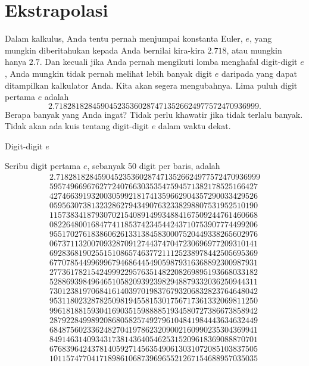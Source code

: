 
\section{\label{sec:Extrapolation}Ekstrapolasi}

Dalam kalkulus, Anda tentu pernah menjumpai konstanta Euler, $e$,
yang mungkin diberitahukan kepada Anda bernilai kira-kira $2.718$,
atau mungkin hanya $2.7$. Dan kecuali jika Anda pernah mengikuti
lomba menghafal digit-digit $e$, Anda mungkin tidak pernah melihat
lebih banyak digit $e$ daripada yang dapat ditampilkan kalkulator
Anda. Kita akan segera mengubahnya. Lima puluh digit pertama $e$
adalah
\[
2.7182818284590452353602874713526624977572470936999.
\]
Berapa banyak yang Anda ingat? Tidak perlu khawatir jika tidak terlalu
banyak. Tidak akan ada kuis tentang digit-digit $e$ dalam waktu dekat. 

\noindent\begin{digression}{Digit-digit $e$} 

\noindent Seribu digit pertama $e$, sebanyak 50 digit per baris,
adalah
\[
\begin{gathered}2.7182818284590452353602874713526624977572470936999\\
59574966967627724076630353547594571382178525166427\\
42746639193200305992181741359662904357290033429526\\
05956307381323286279434907632338298807531952510190\\
11573834187930702154089149934884167509244761460668\\
08226480016847741185374234544243710753907774499206\\
95517027618386062613313845830007520449338265602976\\
06737113200709328709127443747047230696977209310141\\
69283681902551510865746377211125238978442505695369\\
67707854499699679468644549059879316368892300987931\\
27736178215424999229576351482208269895193668033182\\
52886939849646510582093923982948879332036250944311\\
73012381970684161403970198376793206832823764648042\\
95311802328782509819455815301756717361332069811250\\
99618188159304169035159888851934580727386673858942\\
28792284998920868058257492796104841984443634632449\\
68487560233624827041978623209002160990235304369941\\
84914631409343173814364054625315209618369088870701\\
67683964243781405927145635490613031072085103837505\\
10115747704171898610687396965521267154688957035035
\end{gathered}
\]

\noindent\end{digression}

